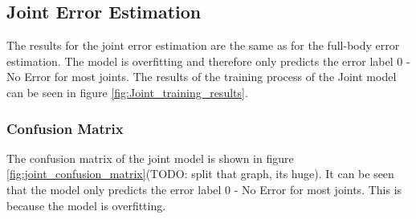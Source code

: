 \subsection{Joint Error Estimation}
\label{sec:joint_error_estimation}

The results for the joint error estimation are the same as for the full-body error estimation. The model is overfitting and therefore only predicts the error label $0$ - No Error for most joints. The results of the training process of the Joint model can be seen in figure \ref{fig:Joint_training_results}.

\subsubsection{Confusion Matrix}

The confusion matrix of the joint model is shown in figure \ref{fig:joint_confusion_matrix}(TODO: split that graph, its huge). It can be seen that the model only predicts the error label $0$ - No Error for most joints. This is because the model is overfitting.


